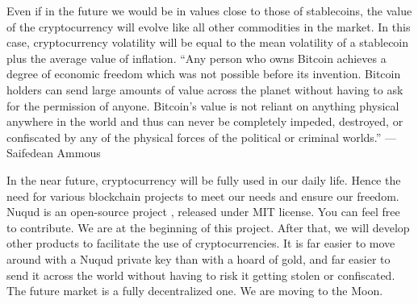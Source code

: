 \documentclass[12pt]{article}
\begin{document}
Even if in the future we would be in values close to those of stablecoins, the value of the cryptocurrency will evolve like all other commodities in the market. In this case, cryptocurrency volatility will be equal to the mean volatility of a stablecoin plus the average value of inflation. “Any person who owns Bitcoin achieves a degree of economic freedom which was not possible before its invention. Bitcoin holders can send large amounts of value across the planet without having to ask for the permission of anyone. Bitcoin's value is not reliant on anything physical anywhere in the world and thus can never be completely impeded, destroyed, or confiscated by any of the physical forces of the political or criminal worlds.” —Saifedean Ammous \cite{ammous2018bitcoin}

In the near future, cryptocurrency will be fully used in our daily life. Hence the need for various blockchain projects to meet our needs and ensure our freedom. Nuqud is an open-source project \cite{nuqud2021repository}, released under MIT license. You can feel free to contribute. We are at the beginning of this project. After that, we will develop other products to facilitate the use of cryptocurrencies. It is far easier to move around with a Nuqud private key than with a hoard of gold, and far easier to send it across the world without having to risk it getting stolen or confiscated. The future market is a fully decentralized one. We are moving to the Moon.



\end{document}

